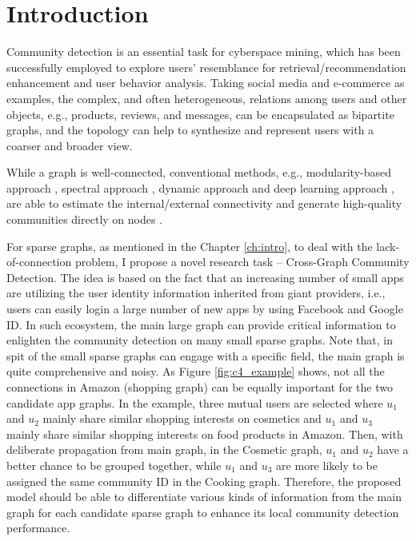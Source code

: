 \section{Introduction}

Community detection is an essential task for cyberspace mining, which has been successfully employed to explore users’ resemblance for retrieval/recommendation enhancement and user behavior analysis. Taking social media and e-commerce as examples, the complex, and often heterogeneous, relations among users and other objects, e.g., products, reviews, and messages, can be encapsulated as bipartite graphs, and the topology can help to synthesize and represent users with a coarser and broader view.

While a graph is well-connected, conventional methods, e.g., modularity-based approach \cite{newman2004fast}, spectral approach \cite{nascimento2011spectral}, dynamic approach \cite{peixoto2017modelling} and deep learning approach \cite{chiang2019cluster}, are able to estimate the internal/external connectivity and generate high-quality communities directly on nodes \cite{fortunato2016community}.
 
For sparse graphs, as mentioned in the Chapter \ref{ch:intro}, to deal with the lack-of-connection problem, I propose  a novel research task – Cross-Graph Community Detection. The idea is based on the fact that an increasing number of small apps are utilizing the user identity information inherited from giant providers, i.e., users can easily login a large number of new apps by using Facebook and Google ID. In such ecosystem, the main large graph can provide critical information to enlighten the community detection on many small sparse graphs. Note that, in spit of the small sparse graphs can engage with a specific field, the main graph is quite comprehensive and noisy. As Figure \ref{fig:c4_example} shows, not all the connections in Amazon (shopping graph) can be equally important for the two candidate app graphs. In the example, three mutual users are selected where $u_1$ and $u_2$ mainly share similar shopping interests on cosmetics and $u_1$ and $u_3$ mainly share similar shopping interests on food products in Amazon. Then, with deliberate propagation from main graph, in the Cosmetic graph, $u_1$ and $u_2$ have a better chance to be grouped together, while $u_1$ and $u_3$ are more likely to be assigned the same community ID in the Cooking graph. Therefore, the proposed model should be able to differentiate various kinds of information from the main graph for each candidate sparse graph to enhance its local community detection performance. 

